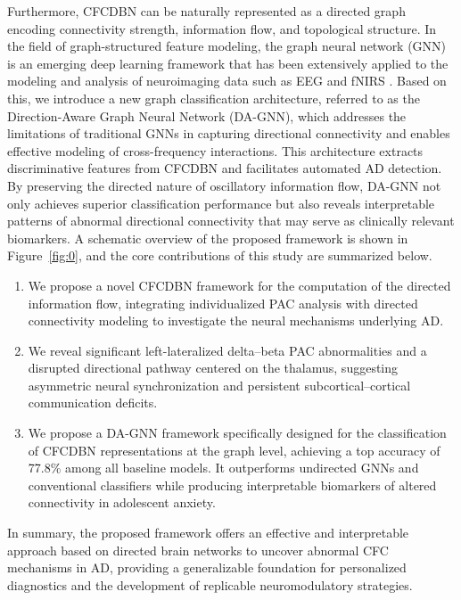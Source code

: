 \documentclass[lettersize,journal]{IEEEtran}
\begin{document}
Furthermore, CFCDBN can be naturally represented as a directed graph encoding connectivity strength, information flow, and topological structure. 
In the field of graph-structured feature modeling, the graph neural network (GNN) is an emerging deep learning framework that has been extensively applied to the modeling and analysis of neuroimaging data such as EEG and fNIRS \cite{wang2020linking,wang2025hybrid}. Based on this, we introduce a new graph classification architecture, referred to as the Direction-Aware Graph Neural Network (DA-GNN), which addresses the limitations of traditional GNNs in capturing directional connectivity and enables effective modeling of cross-frequency interactions. This architecture extracts discriminative features from CFCDBN and facilitates automated AD detection.
By preserving the directed nature of oscillatory information flow, DA-GNN not only achieves superior classification performance but also reveals interpretable patterns of abnormal directional connectivity that may serve as clinically relevant biomarkers.
A schematic overview of the proposed framework is shown in Figure~\ref{fig:0}, and the core contributions of this study are summarized below.
\begin{enumerate}
    \item We propose a novel CFCDBN framework for the computation of the directed information flow, integrating individualized PAC analysis with directed connectivity modeling to investigate the neural mechanisms underlying AD.
    
    \item We reveal significant left-lateralized delta–beta PAC abnormalities and a disrupted directional pathway centered on the thalamus, suggesting asymmetric neural synchronization and persistent subcortical–cortical communication deficits.

    \item We propose a DA-GNN framework specifically designed for the classification of CFCDBN representations at the graph level, achieving a top accuracy of 77.8\% among all baseline models. It outperforms undirected GNNs and conventional classifiers while producing interpretable biomarkers of altered connectivity in adolescent anxiety.
\end{enumerate}

In summary, the proposed framework offers an effective and interpretable approach based on directed brain networks to uncover abnormal CFC mechanisms in AD, providing a generalizable foundation for personalized diagnostics and the development of replicable neuromodulatory strategies.
\end{document}
